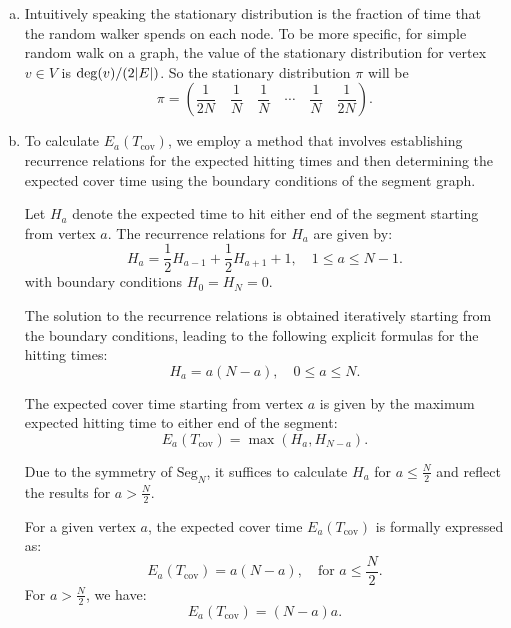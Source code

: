 \begin{solution}
	\begin{enumerate}[(a)]
		\item Intuitively speaking the stationary distribution is the fraction of time that the random walker spends on each node. To be more specific, for simple random walk on a graph, the value of the stationary distribution for vertex $v \in V$ is $\deg(v)/(2|E|)$. So the stationary distribution $\pi$ will be
		\[ \pi = (\frac{1}{2N}\quad \frac{1}{N}\quad \frac{1}{N}\quad \cdots\quad \frac{1}{N}\quad \frac{1}{2N}). \]
		
		\item 
		To calculate \( E_a(T_{\text{cov}}) \), we employ a method that involves establishing recurrence relations for the expected hitting times and then determining the expected cover time using the boundary conditions of the segment graph.
		
		Let \( H_a \) denote the expected time to hit either end of the segment starting from vertex \( a \). The recurrence relations for \( H_a \) are given by:
		\begin{equation}
			H_a = \frac{1}{2}H_{a-1} + \frac{1}{2}H_{a+1} + 1, \quad 1 \leq a \leq N-1.
		\end{equation}
		with boundary conditions \( H_0 = H_N = 0 \).
		
		The solution to the recurrence relations is obtained iteratively starting from the boundary conditions, leading to the following explicit formulas for the hitting times:
		\begin{equation*}
			H_a = a(N-a), \quad 0 \leq a \leq N.
		\end{equation*}
		
		The expected cover time starting from vertex \( a \) is given by the maximum expected hitting time to either end of the segment:
		\begin{equation*}
			E_a(T_{\text{cov}}) = \max(H_a, H_{N-a}).
		\end{equation*}
		
		Due to the symmetry of \( \text{Seg}_N \), it suffices to calculate \( H_a \) for \( a \leq \frac{N}{2} \) and reflect the results for \( a > \frac{N}{2} \).
		
		For a given vertex \( a \), the expected cover time \( E_a(T_{\text{cov}}) \) is formally expressed as:
		\begin{equation*}
			E_a(T_{\text{cov}}) = a(N-a), \quad \text{for } a \leq \frac{N}{2}.
		\end{equation*}
		For \( a > \frac{N}{2} \), we have:
		\begin{equation*}
			E_a(T_{\text{cov}}) = (N-a)a.
		\end{equation*}
		

\end{enumerate}
\end{solution}
